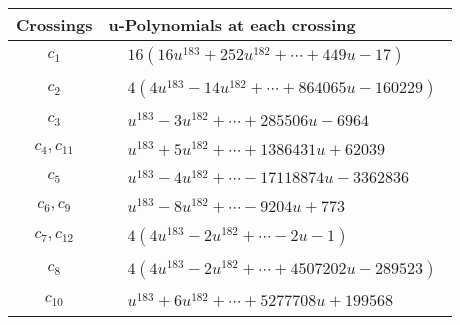 \documentclass[1p]{elsarticle_modified}
\theoremstyle{definition}
\begin{document}
\begin{tabular}{m{50pt}|m{274pt}}
Crossings & \hspace{64pt}u-Polynomials at each crossing \\
\hline $$\begin{aligned}c_{1}\end{aligned}$$&$\begin{aligned}
&16(16 u^{183}+252 u^{182}+\cdots+449 u-17)
\end{aligned}$\\
\hline $$\begin{aligned}c_{2}\end{aligned}$$&$\begin{aligned}
&4(4 u^{183}-14 u^{182}+\cdots+864065 u-160229)
\end{aligned}$\\
\hline $$\begin{aligned}c_{3}\end{aligned}$$&$\begin{aligned}
&u^{183}-3 u^{182}+\cdots+285506 u-6964
\end{aligned}$\\
\hline $$\begin{aligned}c_{4},c_{11}\end{aligned}$$&$\begin{aligned}
&u^{183}+5 u^{182}+\cdots+1386431 u+62039
\end{aligned}$\\
\hline $$\begin{aligned}c_{5}\end{aligned}$$&$\begin{aligned}
&u^{183}-4 u^{182}+\cdots-17118874 u-3362836
\end{aligned}$\\
\hline $$\begin{aligned}c_{6},c_{9}\end{aligned}$$&$\begin{aligned}
&u^{183}-8 u^{182}+\cdots-9204 u+773
\end{aligned}$\\
\hline $$\begin{aligned}c_{7},c_{12}\end{aligned}$$&$\begin{aligned}
&4(4 u^{183}-2 u^{182}+\cdots-2 u-1)
\end{aligned}$\\
\hline $$\begin{aligned}c_{8}\end{aligned}$$&$\begin{aligned}
&4(4 u^{183}-2 u^{182}+\cdots+4507202 u-289523)
\end{aligned}$\\
\hline $$\begin{aligned}c_{10}\end{aligned}$$&$\begin{aligned}
&u^{183}+6 u^{182}+\cdots+5277708 u+199568
\end{aligned}$\\
\hline
\end{tabular}\\~\\
\end{document}
